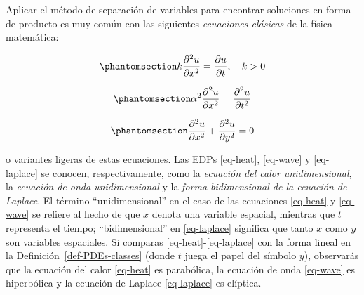 \documentclass[
  spanish,
  us-letterpaper,
  DIV=11,
  numbers=noendperiod]{scrreprt}
\theoremstyle{plain}
\theoremstyle{definition}
\theoremstyle{remark}
\begin{document}
Aplicar el método de separación de variables para encontrar soluciones
en forma de producto es muy común con las siguientes \emph{ecuaciones
clásicas} de la física matemática:

\begin{equation}\phantomsection\label{eq-heat}{  
k\frac{\partial^2 u}{\partial x^2} = \frac{\partial u}{\partial t}, \quad k > 0  
}\end{equation}

\begin{equation}\phantomsection\label{eq-wave}{  
\alpha^2 \frac{\partial^2 u}{\partial x^2} = \frac{\partial^2 u}{\partial t^2}  
}\end{equation}

\begin{equation}\phantomsection\label{eq-laplace}{  
\frac{\partial^2 u}{\partial x^2} + \frac{\partial^2 u}{\partial y^2} = 0  
}\end{equation}

o variantes ligeras de estas ecuaciones. Las EDPs \ref{eq-heat},
\ref{eq-wave} y \ref{eq-laplace} se conocen, respectivamente, como la
\emph{ecuación del calor unidimensional}, la \emph{ecuación de onda
unidimensional} y la \emph{forma bidimensional de la ecuación de
Laplace}. El término ``unidimensional'' en el caso de las ecuaciones
\ref{eq-heat} y \ref{eq-wave} se refiere al hecho de que \(x\) denota
una variable espacial, mientras que \(t\) representa el tiempo;
``bidimensional'' en \ref{eq-laplace} significa que tanto \(x\) como
\(y\) son variables espaciales. Si comparas
\ref{eq-heat}-\ref{eq-laplace} con la forma lineal en la
Definición~\ref{def-PDEs-classes} (donde \(t\) juega el papel del
símbolo \(y\)), observarás que la ecuación del calor \ref{eq-heat} es
parabólica, la ecuación de onda \ref{eq-wave} es hiperbólica y la
ecuación de Laplace \ref{eq-laplace} es elíptica.
\end{document}
